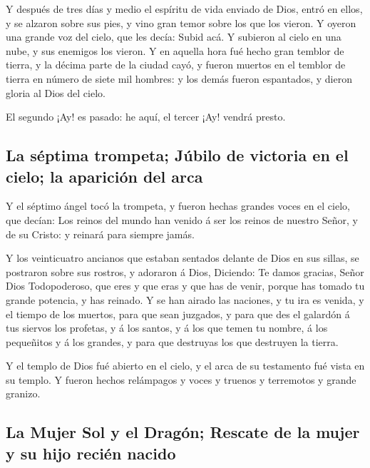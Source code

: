  Y después de tres días y medio el espíritu de vida enviado
de Dios, entró en ellos, y se alzaron sobre sus pies, y vino gran temor
sobre los que los vieron.  Y oyeron una grande voz del
cielo, que les decía: Subid acá. Y subieron al cielo en una nube, y sus
enemigos los vieron.  Y en aquella hora fué hecho gran
temblor de tierra, y la décima parte de la ciudad cayó, y fueron muertos
en el temblor de tierra en número de siete mil hombres: y los demás
fueron espantados, y dieron gloria al Dios del cielo.

 El segundo ¡Ay! es pasado: he aquí, el tercer ¡Ay! vendrá
presto.

\hypertarget{la-suxe9ptima-trompeta-juxfabilo-de-victoria-en-el-cielo-la-apariciuxf3n-del-arca}{%
\subsection{La séptima trompeta; Júbilo de victoria en el cielo; la
aparición del
arca}\label{la-suxe9ptima-trompeta-juxfabilo-de-victoria-en-el-cielo-la-apariciuxf3n-del-arca}}

 Y el séptimo ángel tocó la trompeta, y fueron hechas
grandes voces en el cielo, que decían: Los reinos del mundo han venido á
ser los reinos de nuestro Señor, y de su Cristo: y reinará para siempre
jamás.

 Y los veinticuatro ancianos que estaban sentados delante
de Dios en sus sillas, se postraron sobre sus rostros, y adoraron á
Dios,  Diciendo: Te damos gracias, Señor Dios Todopoderoso,
que eres y que eras y que has de venir, porque has tomado tu grande
potencia, y has reinado.  Y se han airado las naciones, y
tu ira es venida, y el tiempo de los muertos, para que sean juzgados, y
para que des el galardón á tus siervos los profetas, y á los santos, y á
los que temen tu nombre, á los pequeñitos y á los grandes, y para que
destruyas los que destruyen la tierra.

 Y el templo de Dios fué abierto en el cielo, y el arca de
su testamento fué vista en su templo. Y fueron hechos relámpagos y voces
y truenos y terremotos y grande granizo.

\hypertarget{la-mujer-sol-y-el-draguxf3n-rescate-de-la-mujer-y-su-hijo-reciuxe9n-nacido}{%
\subsection{La Mujer Sol y el Dragón; Rescate de la mujer y su hijo
recién
nacido}\label{la-mujer-sol-y-el-draguxf3n-rescate-de-la-mujer-y-su-hijo-reciuxe9n-nacido}}

